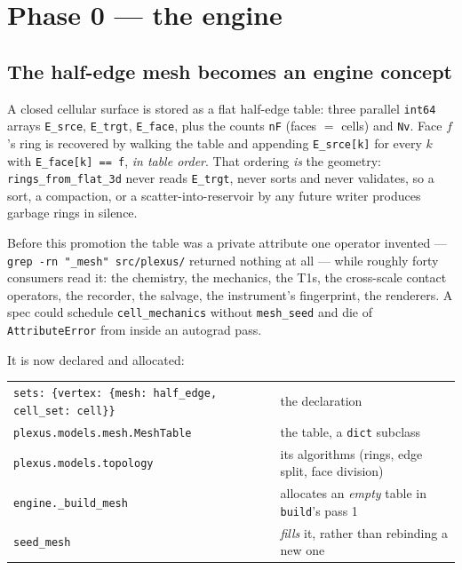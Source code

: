 \documentclass[11pt,a4paper]{article}
\newcommand{\code}[1]{\texttt{\small #1}}
\begin{document}
\section{Phase 0 --- the engine}

\subsection{The half-edge mesh becomes an engine concept}

A closed cellular surface is stored as a flat half-edge table: three parallel \code{int64} arrays
\code{E\_srce}, \code{E\_trgt}, \code{E\_face}, plus the counts \code{nF} (faces $=$ cells) and
\code{Nv}. Face $f$'s ring is recovered by walking the table and appending \code{E\_srce[k]} for
every $k$ with \code{E\_face[k] == f}, \emph{in table order}. That ordering \emph{is} the geometry:
\code{rings\_from\_flat\_3d} never reads \code{E\_trgt}, never sorts and never validates, so a sort,
a compaction, or a scatter-into-reservoir by any future writer produces garbage rings in silence.

Before this promotion the table was a private attribute one operator invented ---
\code{grep -rn "\_mesh" src/plexus/} returned nothing at all --- while roughly forty consumers read
it: the chemistry, the mechanics, the T1s, the cross-scale contact operators, the recorder, the
salvage, the instrument's fingerprint, the renderers. A spec could schedule \code{cell\_mechanics}
without \code{mesh\_seed} and die of \code{AttributeError} from inside an autograd pass.

It is now declared and allocated:

\begin{center}\small
\begin{tabular}{@{}ll@{}}\toprule
\code{sets: \{vertex: \{mesh: half\_edge, cell\_set: cell\}\}} & the declaration\\
\code{plexus.models.mesh.MeshTable} & the table, a \code{dict} subclass\\
\code{plexus.models.topology} & its algorithms (rings, edge split, face division)\\
\code{engine.\_build\_mesh} & allocates an \emph{empty} table in \code{build}'s pass 1\\
\code{seed\_mesh} & \emph{fills} it, rather than rebinding a new one\\
\bottomrule
\end{tabular}
\end{center}
\end{document}

